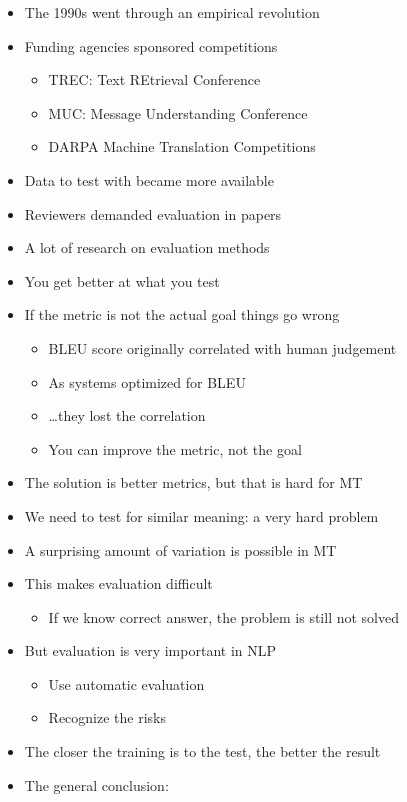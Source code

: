 \documentclass[a4paper,landscape,headrule,footrule,dvips]{foils}
\begin{document}
\begin{CJK}{UTF8}{min}
  \begin{itemize}
  \item The 1990s went through an empirical revolution
  \item Funding agencies sponsored competitions
    \begin{itemize}
    \item TREC: Text REtrieval Conference
    \item MUC: Message Understanding Conference
    \item DARPA Machine Translation Competitions
    \end{itemize}
  \item Data to test with became more available
  \item Reviewers demanded evaluation in papers
  \item A lot of research on evaluation methods
  \end{itemize}



\begin{itemize}
\item {\large You get better at what you test}
\item If the metric is not the actual goal things go wrong
  \begin{itemize}
  \item  BLEU score originally correlated with human judgement
  \item As systems optimized for BLEU
  \item \ldots they lost the correlation
  \item You can  improve the metric, not the goal
  \end{itemize}
\item The solution is better metrics, but that is hard for MT
\item We need to test for similar meaning: a very hard problem
\end{itemize}



\begin{itemize}
\item A surprising amount of variation is possible in MT
\item This makes evaluation difficult
  \begin{itemize}
  \item If we know  correct answer, the problem is still not solved
  \end{itemize}
\item But evaluation is very important in NLP
  \begin{itemize}
  \item Use automatic evaluation
  \item Recognize the risks
  \end{itemize}
\item The closer the training is to the test, the better the result
\item The general conclusion: 
\end{itemize}


\end{CJK}
\end{document}

